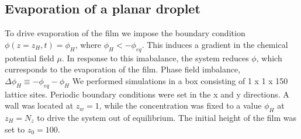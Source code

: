 \documentclass[a0,portrait]{a0poster}
\begin{document}
\begin{multicols}{3}
\section{Evaporation of a planar droplet}

To drive evaporation of the film we impose the boundary condition $\phi(z=z_{H},t)=\phi_{H}$, where $\phi_{H} < -\phi_{eq}$. This induces a gradient in the chemical potential field $\mu$. In response to this imabalance, the system reduces $\phi$, which curresponds to the evaporation of the film\cite{paper:evaporation}.
Phase field imbalance, $\Delta\phi_{H} \equiv -\phi_{eq} - \phi_{H}$
\newline
We performed simulations in a box consisting of  1 x 1 x 150 lattice sites. Periodic boundary conditions were set in the x and
y directions. A wall was located at $ z_{w} = 1 $, while the concentration
was fixed to a value $ \phi_{H}$ at $z_{H} = N_{z} $ to drive the system out of equilibrium. The initial height of the film was set to $z_{0} = 100$. 

\begin{figure}[H]
	\begin{center}
		\begin{subfigure}{6cm}
\end{subfigure}
\end{center}
\end{figure}
\end{multicols}
\end{document}
